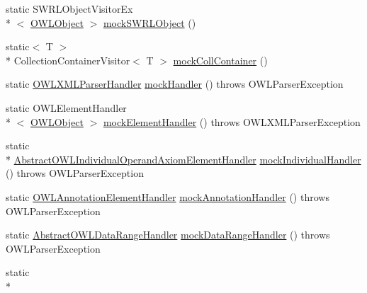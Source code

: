 \begin{DoxyCompactItemize}
\item 
static S\-W\-R\-L\-Object\-Visitor\-Ex\\*
$<$ \hyperlink{interfaceorg_1_1semanticweb_1_1owlapi_1_1model_1_1_o_w_l_object}{O\-W\-L\-Object} $>$ \hyperlink{classorg_1_1semanticweb_1_1owlapi_1_1contract_1_1_utils_ad7b7b0ba9f7e5b5f44bad11a24cde628}{mock\-S\-W\-R\-L\-Object} ()
\item 
static$<$ T $>$\\*
 Collection\-Container\-Visitor$<$ T $>$ \hyperlink{classorg_1_1semanticweb_1_1owlapi_1_1contract_1_1_utils_a2f93d41ef871ae316e070faa425fc809}{mock\-Coll\-Container} ()
\item 
static \hyperlink{classorg_1_1coode_1_1owlapi_1_1owlxmlparser_1_1_o_w_l_x_m_l_parser_handler}{O\-W\-L\-X\-M\-L\-Parser\-Handler} \hyperlink{classorg_1_1semanticweb_1_1owlapi_1_1contract_1_1_utils_a47b7fdf0af98ff86e91175b9972d6621}{mock\-Handler} ()  throws O\-W\-L\-Parser\-Exception 
\item 
static O\-W\-L\-Element\-Handler\\*
$<$ \hyperlink{interfaceorg_1_1semanticweb_1_1owlapi_1_1model_1_1_o_w_l_object}{O\-W\-L\-Object} $>$ \hyperlink{classorg_1_1semanticweb_1_1owlapi_1_1contract_1_1_utils_abeca8d38b399178f899d141ffc9e1b0d}{mock\-Element\-Handler} ()  throws O\-W\-L\-X\-M\-L\-Parser\-Exception 
\item 
static \\*
\hyperlink{classorg_1_1coode_1_1owlapi_1_1owlxmlparser_1_1_abstract_o_w_l_individual_operand_axiom_element_handler}{Abstract\-O\-W\-L\-Individual\-Operand\-Axiom\-Element\-Handler} \hyperlink{classorg_1_1semanticweb_1_1owlapi_1_1contract_1_1_utils_a4d46ffd3277c14c3e6ad1e95a38d7570}{mock\-Individual\-Handler} ()  throws O\-W\-L\-Parser\-Exception 
\item 
static \hyperlink{classorg_1_1coode_1_1owlapi_1_1owlxmlparser_1_1_o_w_l_annotation_element_handler}{O\-W\-L\-Annotation\-Element\-Handler} \hyperlink{classorg_1_1semanticweb_1_1owlapi_1_1contract_1_1_utils_a7290e0c1da4fc01f34ab0e9fa99d213b}{mock\-Annotation\-Handler} ()  throws O\-W\-L\-Parser\-Exception 
\item 
static \hyperlink{classorg_1_1coode_1_1owlapi_1_1owlxmlparser_1_1_abstract_o_w_l_data_range_handler}{Abstract\-O\-W\-L\-Data\-Range\-Handler} \hyperlink{classorg_1_1semanticweb_1_1owlapi_1_1contract_1_1_utils_a636e9ec8646b79e1ed20d820d062abcd}{mock\-Data\-Range\-Handler} ()  throws O\-W\-L\-Parser\-Exception 
\item 
static \\*

\end{DoxyCompactItemize}
